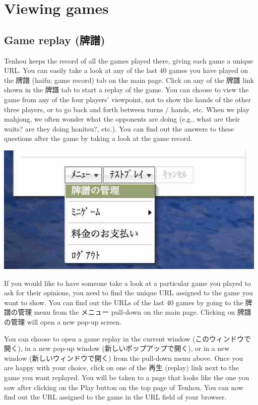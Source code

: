\section{Viewing games}
\subsection{Game replay (牌譜)}
{\jap Tenhou} keeps the record of all the games played there, giving each game a unique URL. 
You can easily take a look at any of the last 40 games you have played on the 牌譜 ({\jap haifu}; game record) tab on the main page. Click on any of the 牌譜 link shown in the 牌譜 tab to start a replay of the game. You can choose to view the game from any of the four players' viewpoint, not to show the hands of the other three players, or to go back and forth between turns / hands, etc. When we play mahjong, we often wonder what the opponents are doing (e.g., what are their waits? are they doing {\jap honitsu}?, etc.). You can find out the answers to these questions after the game by taking a look at the game record. 


\begin{center}
\includegraphics[width=.4\textwidth,clip]{figs/haifukanri.jpg}
\end{center}

If you would like to have someone take a look at a particular game you played to ask for their opinions, you need to find the unique URL assigned to the game you want to show. You can find out the URLs of the last 40 games by going to the 牌譜の管理 menu from the メニュー pull-down on the main page. 
Clicking on 牌譜の管理 will open a new pop-up screen.

\bigskip
You can choose to open a game replay in the current window (このウィンドウで開く), in a new pop-up window (新しいポップアップで開く), or in a new window (新しいウィンドウで開く) from the pull-down menu above. Once you are happy with your choice, click on one of the 再生 (replay) link next to the game you want replayed. 
You will be taken to a page that looks like the one you saw after clicking on the Play button on the top page of {\jap Tenhou}. You can now find out the URL assigned to the game in the URL field of your browser. 

